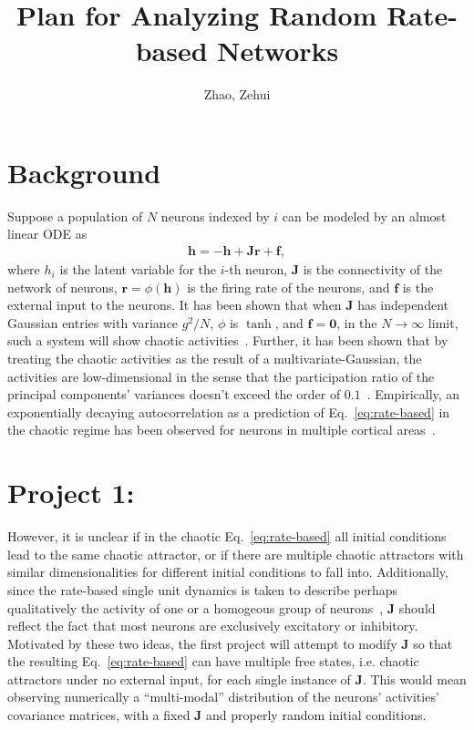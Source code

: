\documentclass[11pt,openany,oneside]{article} %
\title{\vspace{-2em}Plan for Analyzing Random Rate-based Networks}
\author{Zhao, Zehui}
\date{}
\newcommand{\bd}[1]{\boldsymbol{#1}}%
\begin{document}
\maketitle

\section{Background}
Suppose a population of $N$ neurons indexed by $i$ can be modeled by an
almost linear ODE as
\begin{align}
  \label{eq:rate-based}
  \bd{h} = -\bd{h}+\bd{J}\bd{r}+\bd{f},
\end{align}
where $h_i$ is the latent variable for the $i$-th neuron, $\bd{J}$ is the connectivity of the
network of neurons, $\bd{r} = \phi(\bd{h})$ is the firing rate of the neurons, and $\bd{f}$ is the
external input to the neurons.  It has been shown that when $\bd{J}$ has independent Gaussian
entries with variance $g^2/N$, $\phi$ is $\tanh$, and $\bd{f} =\bd{0}$, in the $N\to\infty$ limit,
such a system will show chaotic activities~\cite{sompolinsky1988Chaos}.  Further, it has been shown
that by treating the chaotic activities as the result of a multivariate-Gaussian, the activities are
low-dimensional in the sense that the participation ratio of the principal components' variances
doesn't exceed the order of $0.1$~\cite{clark2022Dimension}.  Empirically, an exponentially decaying autocorrelation
as a prediction of Eq.~\ref{eq:rate-based} in the chaotic regime has been observed for neurons in
multiple cortical areas~\cite{murray2014Hierarchy}.

\section{Project 1:}
However, it is unclear if in the chaotic Eq.~\ref{eq:rate-based} all initial conditions lead to the
same chaotic attractor, or if there are multiple chaotic attractors with similar dimensionalities
for different initial conditions to fall into.  Additionally, since the rate-based single unit
dynamics is taken to describe perhaps qualitatively the activity of one or a homogeous
group of neurons~\cite{dayan2005Theoretical, ocker2022Dynamics}, $\bd{J}$ should reflect the fact that most neurons are exclusively
excitatory or inhibitory.  Motivated by these two ideas, the first project will attempt to modify
$\bd{J}$ so that the resulting Eq.~\ref{eq:rate-based} can have multiple free states, i.e. chaotic
attractors under no external input, for each single instance of $\bd{J}$.  This would mean observing
numerically a ``multi-modal'' distribution of the neurons' activities' covariance matrices, with a
fixed $\bd{J}$ and properly random initial conditions.
\end{document}
